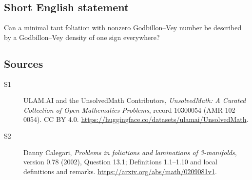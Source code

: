 \documentclass[11pt]{article}
\begin{document}
\subsection{Short English statement}
Can a minimal taut foliation with nonzero Godbillon--Vey number be described by a Godbillon--Vey density of one sign everywhere?
\subsection{Sources}
\begin{description}
\item[\hypertarget{source:10300054:1}{S1}] ULAM.AI and the UnsolvedMath Contributors, \emph{UnsolvedMath: A Curated Collection of Open Mathematics Problems}, record 10300054 (AMR-102-0054). CC BY 4.0. \url{https://huggingface.co/datasets/ulamai/UnsolvedMath}.
\item[\hypertarget{source:10300054:2}{S2}] Danny Calegari, \emph{Problems in foliations and laminations of 3-manifolds}, version 0.78 (2002), Question 13.1; Definitions 1.1--1.10 and local definitions and remarks. \url{https://arxiv.org/abs/math/0209081v1}.
\end{description}
\label{end:10300054}
\end{document}
